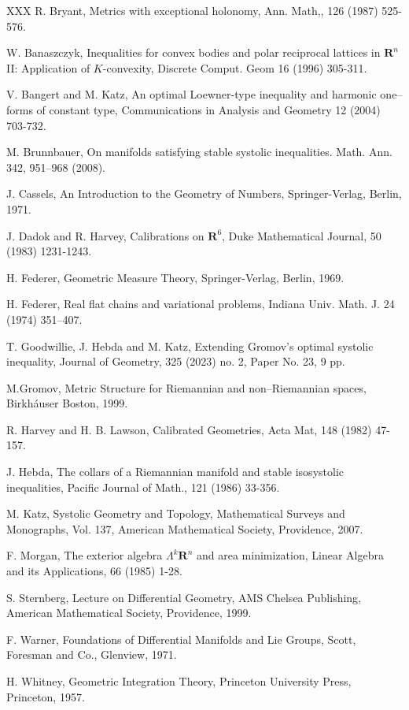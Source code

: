 \documentclass[12pt]{amsart}
\theoremstyle{definition}
\theoremstyle{remark}
\numberwithin{equation}{section}
\begin{document}
\begin{thebibliography}{XXX}
 R. Bryant, Metrics with exceptional holonomy, Ann. Math,, 126 (1987) 525-576.

 W. Banaszczyk, Inequalities for convex bodies and polar reciprocal lattices in $\mathbf{R}^n$ II: Application of $K$-convexity, Discrete Comput. Geom 16 (1996) 305-311.

 V. Bangert and M. Katz, An optimal Loewner-type inequality and harmonic one--forms of constant type, Communications in Analysis and Geometry 12 (2004) 703-732.


 M. Brunnbauer, On manifolds satisfying stable systolic inequalities. Math. Ann. 342, 951–968 (2008).

 J. Cassels, An Introduction to the Geometry of Numbers, Springer-Verlag, Berlin, 1971.

 J. Dadok and R. Harvey, Calibrations on  $\mathbf{R}^6$, Duke Mathematical Journal, 50 (1983) 1231-1243.

 H. Federer, Geometric Measure Theory, Springer-Verlag, Berlin, 1969.

 H. Federer, Real flat chains and variational problems, Indiana Univ. Math. J. 24 (1974) 351--407.

 T. Goodwillie, J. Hebda and M. Katz, Extending Gromov's optimal systolic inequality, Journal of Geometry, 325 (2023) no. 2, Paper No. 23, 9 pp.

 M.Gromov, Metric Structure for Riemannian and non--Riemannian spaces, Birkh\' auser Boston, 1999.

 R. Harvey and H. B. Lawson, Calibrated Geometries, Acta Mat, 148 (1982) 47-157.

 J. Hebda, The collars of a Riemannian manifold and stable isosystolic inequalities,  Pacific Journal of Math., 121 (1986) 33-356.

 M. Katz, Systolic Geometry and Topology, Mathematical Surveys and Monographs, Vol. 137, American Mathematical Society, Providence, 2007.

 F. Morgan, The exterior algebra $\Lambda^k\mathbf{R}^n$ and area minimization, Linear Algebra and its Applications, 66 (1985) 1-28.


 S. Sternberg, Lecture on Differential Geometry, AMS Chelsea Publishing, American Mathematical Society, Providence, 1999.

 F. Warner, Foundations of Differential Manifolds and Lie Groups, Scott, Foresman and Co., Glenview, 1971.

 H. Whitney, Geometric Integration Theory, Princeton University Press, Princeton, 1957.


\end{thebibliography}
\end{document}
